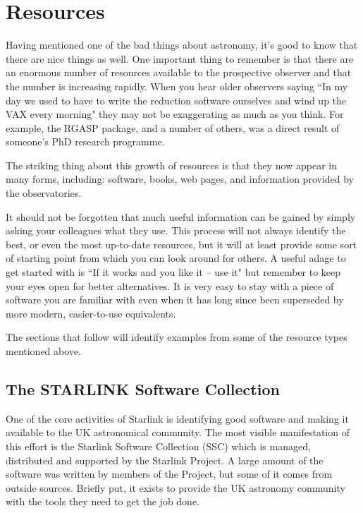 \documentclass[twoside,11pt]{article}
\newcommand{\htmladdnormallink}[2]{#1}
\newcommand{\xref}[3]{#1}
\newcommand{\xlabel}[1]{}
\newcommand{\STARLINKref}{\htmladdnormallink{Starlink}{http://star-www.rl.ac.uk/}}
\newcommand{\SSCref}{\xref{SSC}{sun1}{}}
\begin{document}
\section{Resources} \xlabel{RESOURCES}
\label{sec:resources} 

Having mentioned one of the bad things about astronomy, it's good to know that
there are nice things as well. One important thing to remember is that there
are an enormous number of resources available to the prospective observer and
that the number is increasing rapidly. When you hear older observers saying
``In my day we used to have to write the reduction software ourselves and wind
up the VAX every morning" they may not be exaggerating as much as you think.
For example, the RGASP package, and a number of others, was a direct result of 
someone's PhD research programme.

The striking thing about this growth of resources is that they now appear in
many forms, including: software, books, web pages, and information provided by
the observatories. 

It should not be forgotten that much useful information can be gained by
simply asking your colleagues what they use. This process will not always
identify the best, or even the most up-to-date resources, but it will at
least provide some sort of starting point from which you can look around for
others. A useful adage to get started with is ``If it works and you like it --
use it" but remember to keep your eyes open for better alternatives. It is
very easy to stay with a piece of software you are familiar with even when it
has long since been superseded by more modern, easier-to-use equivalents. 

The sections that follow will identify examples from some of the 
resource types mentioned above. 


\subsection{The STARLINK Software Collection} \xlabel{STARLINK}
\label{sec:starlink}
 
One of the core activities of {\STARLINKref} is identifying 
good software and making it available to the UK astronomical 
community. The most visible manifestation of this
effort is the Starlink Software Collection ({\SSCref}) which is managed, 
distributed and supported by the Starlink Project. A large amount of the 
software was written by members of the Project, but some of it comes from 
outside sources. Briefly put, it exists to provide the UK astronomy 
community with the tools they need to get the job done. 
\end{document}
